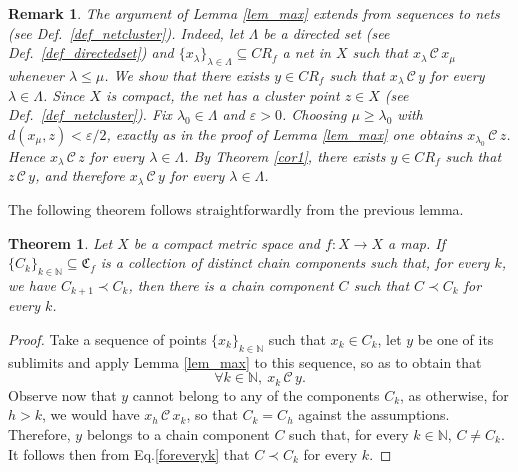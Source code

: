 \documentclass[pdflatex,sn-mathphys-num]{sn-jnl}
\theoremstyle{thmstyleone}%
\newtheorem{thm}{Theorem}
\theoremstyle{thmstyletwo}%
\newtheorem{rem}{Remark}%
\theoremstyle{thmstylethree}%
\begin{document}
\begin{rem}\label{rem_net}
The argument of Lemma \ref{lem_max} extends from sequences to nets (see Def.~\ref{def_netcluster}). 
Indeed, let $\Lambda$ be a directed set (see Def.~\ref{def_directedset}) and
$\{x_\lambda\}_{\lambda\in\Lambda}\subseteq CR_f$ a net in $X$ such that $x_\lambda\,\mathcal{C}\,x_\mu$ whenever $\lambda\leq\mu$. We show that there exists $y\in CR_f$ such that $x_\lambda\,\mathcal{C}\, y$ for every $\lambda\in\Lambda$.
Since $X$ is compact, the net has a cluster point $z\in X$ (see Def.~\ref{def_netcluster}). 
Fix $\lambda_0\in\Lambda$ and $\varepsilon>0$.
Choosing $\mu\geq\lambda_0$ with $d(x_\mu,z)<\varepsilon/2$, exactly as in the
proof of Lemma \ref{lem_max} one obtains $x_{\lambda_0}\,\mathcal{C}\,z$.
Hence $x_\lambda\,\mathcal{C}\,z$ for every $\lambda\in\Lambda$. 
By
Theorem \ref{cor1}, there exists $y\in CR_f$ such that $z\,\mathcal{C}\,y$,
and therefore $x_\lambda\,\mathcal{C}\,y$ for every $\lambda\in\Lambda$.
\end{rem}


\noindent The following theorem follows straightforwardly from the previous lemma.

\begin{thm}\label{thm_max}
Let $X$ be a compact metric space and $f:X\rightarrow X$ a map.
If $\{C_k\}_{k\in\mathbb{N}}\subseteq \mathfrak{C}_f$ is a collection of distinct chain components such that, for every $k$, we have $C_{k+1} \prec C_k$, then there is a chain component $C$ such that $C\prec C_k$ for every $k$.
\end{thm}
\begin{proof}
Take a sequence of points $\{x_k\}_{k\in\mathbb{N}}$ such that $x_k\in C_k$, let $y$ be one of its sublimits and apply Lemma \ref{lem_max} to this sequence, so as to obtain that
\begin{equation}\label{foreveryk}
    \forall k\in\mathbb{N},\  x_k\,\mathcal{C}\,y. 
\end{equation}
Observe now that $y$ cannot belong to any of the components $C_k$, as otherwise, for $h>k$, we would have $x_{h}\,\mathcal{C}\, x_k$, so that $C_k=C_h$ against the assumptions. Therefore, $y$ belongs to a chain component $C$ such that, for every $k\in\mathbb{N}$, $C\neq C_k$. It follows then from Eq.\eqref{foreveryk} that $C\prec C_k$ for every $k$.
\end{proof}
\end{document}
